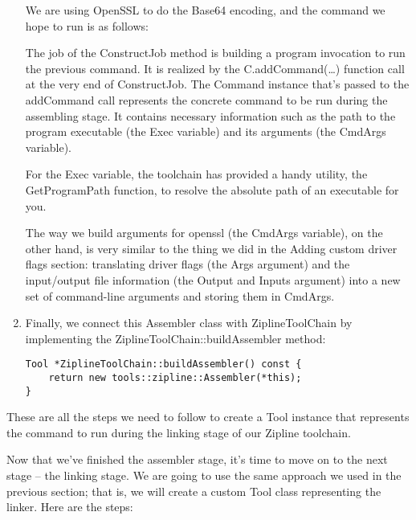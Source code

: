 \begin{enumerate}
We are using OpenSSL to do the Base64 encoding, and the command we hope to run is as follows:


The job of the ConstructJob method is building a program invocation to run the previous command. It is realized by the C.addCommand(…) function call at the very end of ConstructJob. The Command instance that's passed to the addCommand call represents the concrete command to be run during the assembling stage. It contains necessary information such as the path to the program executable (the Exec variable) and its arguments (the CmdArgs variable).

For the Exec variable, the toolchain has provided a handy utility, the GetProgramPath function, to resolve the absolute path of an executable for you.

The way we build arguments for openssl (the CmdArgs variable), on the other hand, is very similar to the thing we did in the Adding custom driver flags section: translating driver flags (the Args argument) and the input/output file information (the Output and Inputs argument) into a new set of command-line arguments and storing them in CmdArgs.

\item Finally, we connect this Assembler class with ZiplineToolChain by implementing the ZiplineToolChain::buildAssembler method:

\begin{lstlisting}[style=styleCXX]
Tool *ZiplineToolChain::buildAssembler() const {
	return new tools::zipline::Assembler(*this);
}
\end{lstlisting}

\end{enumerate}

These are all the steps we need to follow to create a Tool instance that represents the command to run during the linking stage of our Zipline toolchain.


Now that we've finished the assembler stage, it's time to move on to the next stage – the linking stage. We are going to use the same approach we used in the previous section; that is, we will create a custom Tool class representing the linker. Here are the steps:

